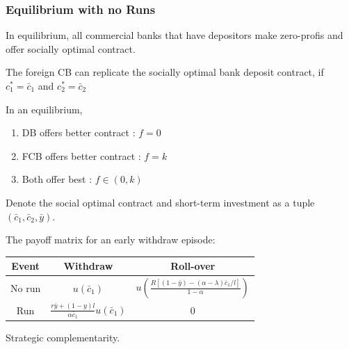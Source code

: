 \begin{frame}
    \frametitle{Equilibrium with no Runs}

    \setcounter{theorem}{1}

    \begin{lemma}
        In equilibrium, all commercial banks that have depositors 
        make zero-profis and offer socially optimal contract.
    \end{lemma}

    \begin{lemma}
        The foreign CB can replicate the socially optimal bank deposit contract, 
        if $c^*_1 = \bar{c}_1$ and $c^*_2 = \bar{c}_2$
    \end{lemma}

    \begin{proposition}
        In an equilibrium, 
        \begin{enumerate}
            \item DB offers better contract : $f=0$
            \item FCB offers better contract : $f=k$
            \item Both offer best : $f\in(0,k)$
        \end{enumerate}
    \end{proposition}
\end{frame}

\begin{frame}
    Denote the social optimal contract and short-term investment as a tuple 
    $(\bar{c}_1, \bar{c}_2, \bar{y})$. 

    The payoff matrix for an early withdraw episode:
    \renewcommand{\arraystretch}{3}
    \begin{table}
        \begin{tabular}{c|c|c}

            Event   & Withdraw & Roll-over \\
            \hline
            No run & $u(\bar{c}_1)$ & $u \left(\frac{R[(1-\bar{y}) - (\alpha - \lambda)\bar{c}_1 / l]}{1-\alpha}\right)$ \\
            Run & $\frac{r\bar{y} + (1-y)l}{\alpha \bar{c}_1} u(\bar{c}_1)$ & $0$ \\
            
        \end{tabular}
    \end{table}

    Strategic complementarity.
    \renewcommand{\arraystretch}{1}
\end{frame}

